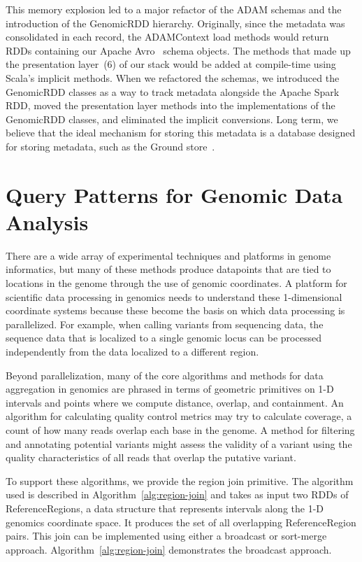 \documentclass[phd]{ucbthesis}
\begin{document}
This memory explosion led to a major refactor of the {ADAM} schemas and
the introduction of the {GenomicRDD} hierarchy. Originally, since the
metadata was consolidated in each record, the {ADAMContext} load methods
would return {RDD}s containing our {Apache Avro}~\cite{avro}
schema objects. The methods that made up the presentation layer~(6) of our stack
would be added at compile-time using {Scala}'s implicit methods. When we
refactored the schemas, we introduced the {GenomicRDD} classes as a way
to track metadata alongside the {Apache Spark} RDD, moved the
presentation layer methods into the implementations of the {GenomicRDD}
classes, and eliminated the implicit conversions. Long term, we believe that the
ideal mechanism for storing this metadata is a database designed for storing
metadata, such as the {Ground} store~\cite{hellerstein17}.

\section{Query Patterns for Genomic Data Analysis}
\label{sec:query-patterns}

There are a wide array of experimental techniques and platforms in genome
informatics, but many of these methods produce datapoints that are tied to
locations in the genome through the use of genomic coordinates. A platform
for scientific data processing in genomics needs to understand these
1-dimensional coordinate systems because these become the basis on which
data processing is parallelized. For example, when calling variants from
sequencing data, the sequence data that is localized to a single genomic
locus can be processed independently from the data localized to a different
region.

Beyond parallelization, many of the core algorithms and methods for data
aggregation in genomics are phrased in terms of geometric primitives on 1-D
intervals and points where we compute distance, overlap, and containment. An
algorithm for calculating quality control metrics may try to calculate coverage,
a count of how many reads overlap each base in the genome. A method for
filtering and annotating potential variants might assess the validity of a
variant using the quality characteristics of all reads that overlap the
putative variant.

To support these algorithms, we provide the region join primitive. The algorithm
used is described in Algorithm~\ref{alg:region-join} and takes as input two RDDs
of {ReferenceRegions}, a data structure that represents intervals along
the 1-D genomics coordinate space. It produces the set of all overlapping
{ReferenceRegion} pairs. This join can be implemented using either a
broadcast or sort-merge approach. Algorithm~\ref{alg:region-join} demonstrates
the broadcast approach.
\end{document}
